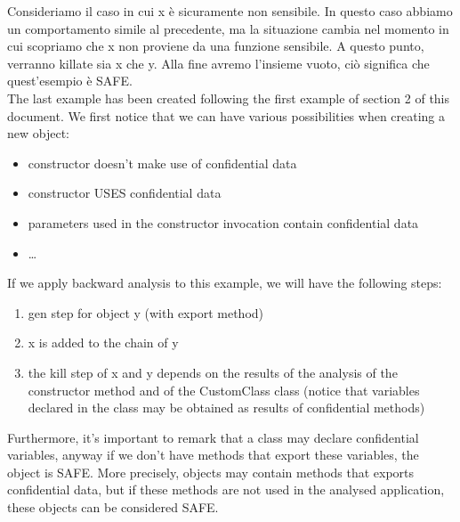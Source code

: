 \documentclass[letterpaper,twocolumn,10pt]{article}
\begin{document}
Consideriamo il caso in cui x è sicuramente non sensibile. In questo caso abbiamo un comportamento simile al precedente, ma la situazione cambia nel momento in cui scopriamo che x non proviene da una funzione sensibile. A questo punto, verranno killate sia x che y. Alla fine avremo l'insieme vuoto, ci\`o significa che quest'esempio \`e SAFE.\\

The last example has been created following the first example of section 2 of this document. We first notice that we can have various possibilities when creating a new object:\\

\begin{itemize}
  \item constructor doesn't make use of confidential data
  \item constructor USES confidential data
  \item parameters used in the constructor invocation contain confidential data
  \item \ldots
\end{itemize}

If we apply backward analysis to this example, we will have the following steps:

\begin{enumerate}
\item gen step for object y (with export method)
\item x is added to the chain of y
\item the kill step of x and y depends on the results of the analysis of the constructor method and of the CustomClass class (notice that variables declared in the class may be obtained as results of confidential methods)
\end{enumerate}

Furthermore, it's important to remark that a class may declare confidential variables, anyway if we don't have methods that export these variables, the object is SAFE. More precisely, objects may contain methods that exports confidential data, but if these methods are not used in the analysed application, these objects can be considered SAFE. \\
\end{document}
